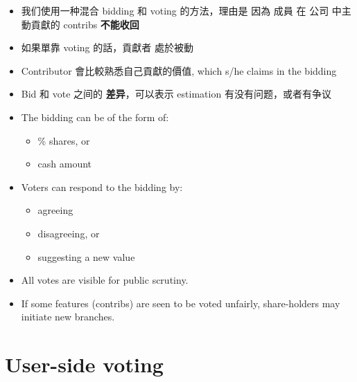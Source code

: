 \documentclass[12pt, orivec, fleqn]{article}
\newcommand{\cc}[2]{#1}
\newcommand{\cc}[2]{#2}
\begin{document}
\begin{itemize}
	\item \cc{
	我们使用一种混合 bidding 和 voting 的方法，理由是 因為 成員 在 公司 中主動貢獻的 contribs \textbf{不能收回}}{
	We consider a mixed voting-bidding scheme, the rationale being that a member's voluntary contribution cannot be \textbf{retracted}
	}
	
	\item \cc{
	如果單靠 voting 的話，貢獻者 處於被動}{
	If we rely solely on voting, contributors are in a passive position
	}

	\item \cc{
	Contributor 會比較熟悉自己貢獻的價值, which s/he claims in the bidding}{
	Contributors would be more in touch with the value of their own contributions, which s/he claims in the bidding
	}
	
	\item \cc{
	Bid 和 vote 之间的 \textbf{差异}，可以表示 estimation 有没有问题，或者有争议}{
	If there is a big difference between bid and voted values, it may indicate an inaccurate assessment or a disagreement.
	}

	\item The bidding can be of the form of:
	\begin{itemize}
		\item \% shares, or
		\item cash amount
	\end{itemize}

	\item Voters can respond to the bidding by:
	\begin{itemize}
		\item agreeing
		\item disagreeing, or
		\item suggesting a new value
	\end{itemize}


	\item All votes are visible for public scrutiny.

	\item If some features (contribs) are seen to be voted unfairly, share-holders may initiate new branches.
\end{itemize}

\secttoc
\section{User-side voting}
\end{document}
